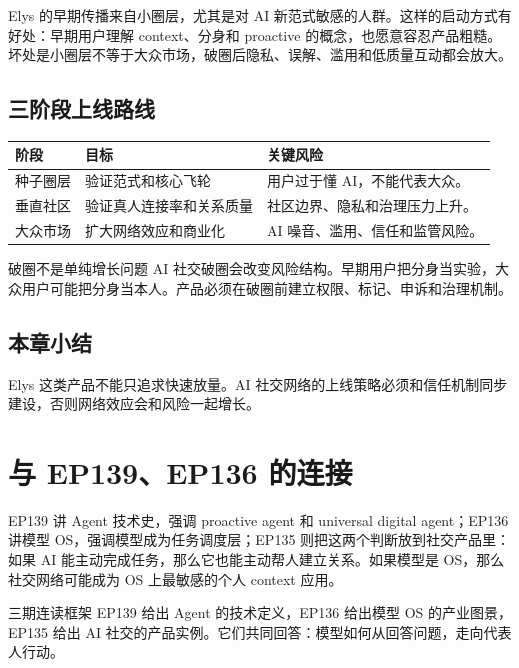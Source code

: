 \documentclass[a4paper]{article}
\begin{document}
Elys 的早期传播来自小圈层，尤其是对 AI 新范式敏感的人群。这样的启动方式有好处：早期用户理解 context、分身和 proactive 的概念，也愿意容忍产品粗糙。坏处是小圈层不等于大众市场，破圈后隐私、误解、滥用和低质量互动都会放大。

\subsection{三阶段上线路线}

\noindent\begin{tabularx}{\textwidth}{p{}p{}X}
\toprule
阶段 & 目标 & 关键风险 \\
\midrule
种子圈层 & 验证范式和核心飞轮 & 用户过于懂 AI，不能代表大众。 \\
垂直社区 & 验证真人连接率和关系质量 & 社区边界、隐私和治理压力上升。 \\
大众市场 & 扩大网络效应和商业化 & AI 噪音、滥用、信任和监管风险。 \\
\bottomrule
\end{tabularx}

\begin{importantbox}{破圈不是单纯增长问题}
AI 社交破圈会改变风险结构。早期用户把分身当实验，大众用户可能把分身当本人。产品必须在破圈前建立权限、标记、申诉和治理机制。
\end{importantbox}

\subsection{本章小结}

Elys 这类产品不能只追求快速放量。AI 社交网络的上线策略必须和信任机制同步建设，否则网络效应会和风险一起增长。

\section{与 EP139、EP136 的连接}

EP139 讲 Agent 技术史，强调 proactive agent 和 universal digital agent；EP136 讲模型 OS，强调模型成为任务调度层；EP135 则把这两个判断放到社交产品里：如果 AI 能主动完成任务，那么它也能主动帮人建立关系。如果模型是 OS，那么社交网络可能成为 OS 上最敏感的个人 context 应用。

\begin{knowledgebox}{三期连读框架}
EP139 给出 Agent 的技术定义，EP136 给出模型 OS 的产业图景，EP135 给出 AI 社交的产品实例。它们共同回答：模型如何从回答问题，走向代表人行动。
\end{knowledgebox}
\end{document}
